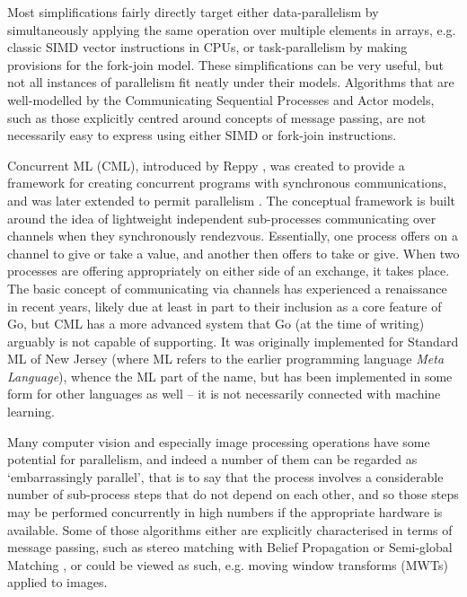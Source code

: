 Most simplifications fairly directly target either data-parallelism by simultaneously applying the same operation over multiple elements in arrays, e.g. classic SIMD vector instructions in CPUs, or task-parallelism by making provisions for the fork-join model.  These simplifications can be very useful, but not all instances of parallelism fit neatly under their models.  Algorithms that are well-modelled by the Communicating Sequential Processes \cite{Hoare1985} and Actor \cite{Agha1997} models, such as those explicitly centred around concepts of message passing, are not necessarily easy to express using either SIMD or fork-join instructions.

Concurrent ML (CML), introduced by Reppy \cite{Reppy1991}, was created to provide a framework for creating concurrent programs with synchronous communications, and was later extended to permit parallelism \cite{Reppy2009a}.  The conceptual framework is built around the idea of lightweight independent sub-processes communicating over channels when they synchronously rendezvous.  Essentially, one process offers on a channel to give or take a value, and another then offers to take or give.  When two processes are offering appropriately on either side of an exchange, it takes place.  The basic concept of communicating via channels has experienced a renaissance in recent years, likely due at least in part to their inclusion as a core feature of Go, but CML has a more advanced system that Go (at the time of writing) arguably is not capable of supporting.  It was originally implemented for Standard ML of New Jersey (where ML refers to the earlier programming language \textit{Meta Language}), whence the ML part of the name, but has been implemented in some form for other languages as well -- it is not necessarily connected with machine learning.

Many computer vision and especially image processing operations have some potential for parallelism, and indeed a number of them can be regarded as `embarrassingly parallel', that is to say that the process involves a considerable number of sub-process steps that do not depend on each other, and so those steps may be performed concurrently in high numbers if the appropriate hardware is available.  Some of those algorithms either are explicitly characterised in terms of message passing, such as stereo matching with Belief Propagation \cite{Liang2011} or Semi-global Matching \cite{Drory2014}, or could be viewed as such, e.g. moving window transforms (MWTs) applied to images.

